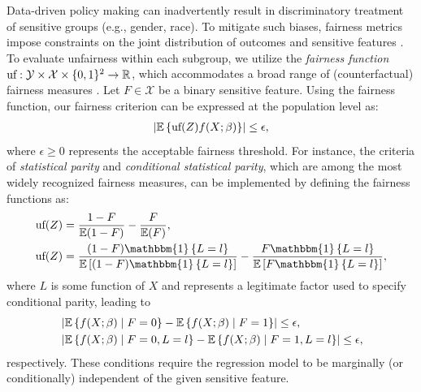 \begin{example1}  \label{example:fairness}
Data-driven policy making can inadvertently result in discriminatory treatment of sensitive groups (e.g., gender, race). To mitigate such biases, fairness metrics impose constraints on the joint distribution of outcomes and sensitive features \citep[e.g.,][]{hardt2016equality, corbett2017algorithmic, barocas2023fairness}. To evaluate unfairness within each subgroup, we utilize the \emph{fairness function} $\text{uf}: \mathcal{Y}\times\mathcal{X}\times\{0,1\}^2 \rightarrow \mathbb{R}$, which accommodates a broad range of (counterfactual) fairness measures \citep[e.g.,][]{mishler2021fade, kim2023fair}. Let $F \in \mathcal{X}$ be a binary sensitive feature. Using the fairness function, our fairness criterion can be expressed at the population level as:
\begin{align} \label{eqn:fairness-function}
    \left\vert \mathbb{E}\left\{\text{uf}(Z) f(X;\beta) \right\} \right\vert \leq \epsilon, 
\end{align}
where $\epsilon\geq0$ represents the acceptable fairness threshold. For instance, the criteria of \emph{statistical parity} and \emph{conditional statistical parity}, which are among the most widely recognized fairness measures, can be implemented by defining the fairness functions as:
\begin{align}
    \text{uf}(Z) & = \frac{1-F}{\E(1-F)} - \frac{F}{\E(F)}, \label{eqn:independence}\\
    \text{uf}(Z) &= \frac{(1-F)\mathbbm{1}\left\{L = l\right\}}{\E\left[(1-F)\mathbbm{1}\left\{L = l\right\}\right]} - \frac{F\mathbbm{1}\left\{L = l\right\}}{\E\left[F\mathbbm{1}\left\{L = l\right\}\right]}, \label{eqn:cond-independence}
\end{align}
where $L$ is some function of $X$ and represents a legitimate factor used to specify conditional parity, leading to 
\begin{align*}
& \left\vert \mathbb{E}\left\{f(X;\beta) \mid F=0 \right\} - \mathbb{E}\left\{f(X;\beta)\mid F=1 \right\} \right\vert \leq \epsilon, \\
&\left\vert \mathbb{E}\left\{f(X;\beta) \mid F=0, L = l \right\} - \mathbb{E}\left\{f(X;\beta) \mid F=1, L = l \right\} \right\vert \leq \epsilon,
\end{align*}
respectively. 
These conditions require the regression model to be marginally (or conditionally) independent of the given sensitive feature.
\end{example1}

